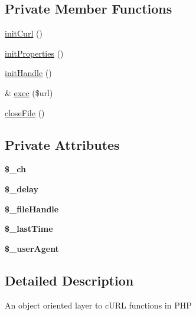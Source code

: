 \subsection*{Private Member Functions}
\begin{DoxyCompactItemize}
\item 
\hyperlink{classCurl_a0ace710830761ebe689cd56f25f6dca7}{init\-Curl} ()
\item 
\hyperlink{classCurl_afb163d5fe9d77d9c9c56680541c3667c}{init\-Properties} ()
\item 
\hyperlink{classCurl_a11bc98534aeadaa26734b539d3b0c57c}{init\-Handle} ()
\item 
\& \hyperlink{classCurl_a3b8b9269f312d733a052656cf38f383a}{exec} (\$url)
\item 
\hyperlink{classCurl_ab31a2bfeb09846946a7b2810bf28cb40}{close\-File} ()
\end{DoxyCompactItemize}
\subsection*{Private Attributes}
\begin{DoxyCompactItemize}
\item 
\hypertarget{classCurl_ae9fd244d8103d86c8ab7ba4b855da1e9}{{\bfseries \$\-\_\-ch}}\label{d0/d69/classCurl_ae9fd244d8103d86c8ab7ba4b855da1e9}

\item 
\hypertarget{classCurl_a961b0595baf5580df38ca75b3c621988}{{\bfseries \$\-\_\-delay}}\label{d0/d69/classCurl_a961b0595baf5580df38ca75b3c621988}

\item 
\hypertarget{classCurl_aa9e959b77f598a03e3432c5ea9b9caab}{{\bfseries \$\-\_\-file\-Handle}}\label{d0/d69/classCurl_aa9e959b77f598a03e3432c5ea9b9caab}

\item 
\hypertarget{classCurl_aed9b68aeb5ffd1c96ce0e2134c56c7b8}{{\bfseries \$\-\_\-last\-Time}}\label{d0/d69/classCurl_aed9b68aeb5ffd1c96ce0e2134c56c7b8}

\item 
\hypertarget{classCurl_abbd20c6067e738b5a89b5f17bda6df41}{{\bfseries \$\-\_\-user\-Agent}}\label{d0/d69/classCurl_abbd20c6067e738b5a89b5f17bda6df41}

\end{DoxyCompactItemize}


\subsection{Detailed Description}
An object oriented layer to c\-U\-R\-L functions in P\-H\-P 

